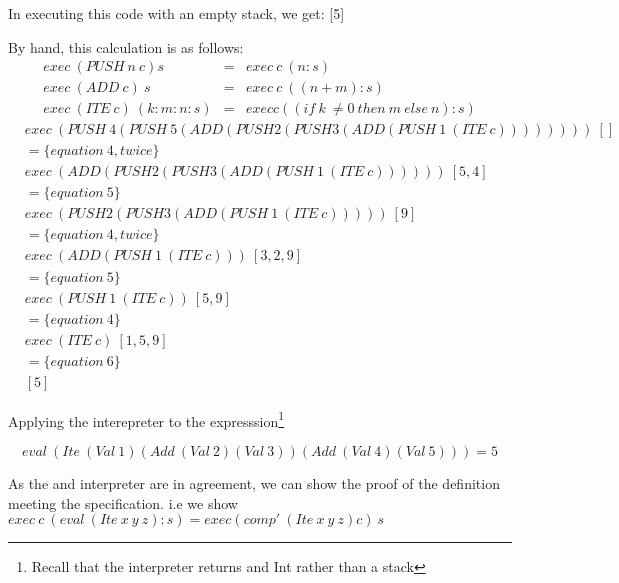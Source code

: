 \documentclass {article}
\begin{document}
In executing this code with an empty stack, we get: [5]

By hand, this calculation is as follows:
\begin{eqnarray}
	exec \ (PUSH \ n \ c) s         &=&  exec \ c \ (n:s) \\
	exec \  (ADD \ c) \ s     &=&  exec \ c \ ((n+m) : s) \\
	exec \  (ITE \ c) \ (k:m:n:s) &=&  exec c ((if \ k \ \not= 0 \ then \ m \ else \ n) : s) 
\end{eqnarray}
\begin{align*}
	&exec \ (PUSH \ 4 (PUSH \ 5 (ADD (PUSH 2 (PUSH 3 (ADD (PUSH \ 1 \ (ITE \ c)))))))) \ [] \\
	&= \{equation \ 4, twice\} \\ 
	&exec \ (ADD (PUSH 2 (PUSH 3 (ADD (PUSH \ 1 \ (ITE \ c)))))) \ [5,4] \\
	&= \{equation \ 5\} \\
	&exec \ (PUSH 2 (PUSH 3 (ADD (PUSH \ 1 \ (ITE \ c))))) \ [9] \\
	&= \{equation \ 4, twice\} \\ 
	&exec \ (ADD (PUSH \ 1 \ (ITE \ c))) \ [3, 2, 9] \\
	&= \{equation \ 5\} \\ 
	&exec \ (PUSH \ 1 \ (ITE \ c)) \ [5, 9] \\
	&= \{equation \ 4\} \\ 
	&exec \ (ITE \ c) \ [1, 5, 9] \\
	&= \{equation \ 6\} \\
	&[5]
\end{align*}

Applying the interepreter to the expresssion\footnote{
Recall that the interpreter returns and Int rather than a stack}

	\[ eval \ (Ite \ (Val \ 1) (Add \ (Val \ 2) (Val \ 3)) (Add \ (Val \ 4) (Val \ 5))) = 5\]

As the \vm and interpreter are in agreement,
we can show the proof of the definition meeting the specification.
i.e we show \( exec \ c \ (eval \ (Ite \ x \ y \ z):s) = exec (comp' \ (Ite \ x \ y \ z) c)  \ s  \)
\end{document}
